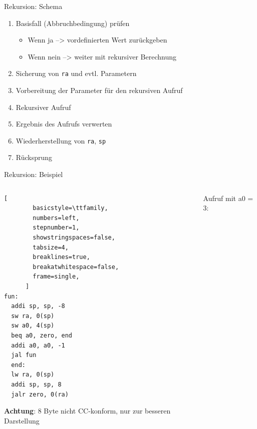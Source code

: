 \documentclass[
  german,            %
  aspectratio=169,    %
]{tumbeamer}
\begin{document}
\begin{frame}[c, fragile]{Rekursion: Schema}{}
  \begin{enumerate}
    \item Basisfall (Abbruchbedingung) prüfen
      \begin{itemize}
        \item Wenn ja --> vordefinierten Wert zurückgeben
        \item Wenn nein --> weiter mit rekursiver Berechnung
      \end{itemize}
    \item Sicherung von \verb|ra| und evtl. Parametern
    \item Vorbereitung der Parameter für den rekursiven Aufruf
    \item Rekursiver Aufruf
    \item Ergebnis des Aufrufs verwerten
    \item Wiederherstellung von \verb|ra|, \verb|sp|
    \item Rücksprung
  \end{enumerate}
\end{frame}

\begin{frame}[c, fragile]{Rekursion: Beispiel}{}
  \begin{columns}[c]
    \begin{column}{0.4\textwidth}
      \begin{lstlisting}[
        basicstyle=\ttfamily,
        numbers=left,
        stepnumber=1,
        showstringspaces=false,
        tabsize=4,
        breaklines=true,
        breakatwhitespace=false,
        frame=single,
      ]
fun:
  addi sp, sp, -8
  sw ra, 0(sp)
  sw a0, 4(sp)
  beq a0, zero, end
  addi a0, a0, -1
  jal fun
  end:
  lw ra, 0(sp)
  addi sp, sp, 8
  jalr zero, 0(ra)
      \end{lstlisting}
      \small \textbf{Achtung}: 8 Byte nicht CC-konform, nur zur besseren Darstellung
    \end{column}
    \begin{column}{0.5\textwidth}
      Aufruf mit {\ttfamily a0 = 3}:
      \vspace{2cm}
    \end{column}
  \end{columns}
\end{frame}
\end{document}
